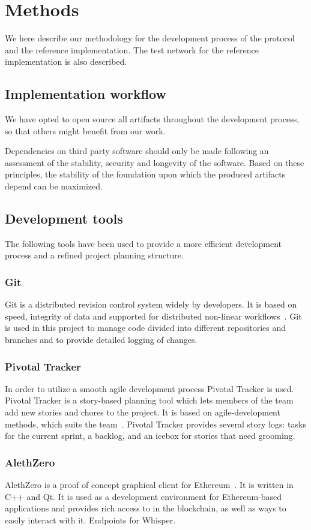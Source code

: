 \chapter{Methods}
We here describe our methodology for the development process of the protocol and the reference implementation. The test network for the reference implementation is also described.

\section{Implementation workflow}
We have opted to open source all artifacts throughout the development process, so that others might benefit from our work.

Dependencies on third party software should only be made following an assessment of the stability, security and longevity of the software. Based on these principles, the stability of the foundation upon which the produced artifacts depend can be maximized.

\section{Development tools}
The following tools have been used to provide a more efficient development process and a refined project planning structure.

\subsection{Git}
Git is a distributed revision control system widely by developers. It is based on speed, integrity of data and supported for distributed non-linear workflows~\cite{git}. Git is used in this project to manage code divided into different repositories and branches and to provide detailed logging of changes. 

\subsection{Pivotal Tracker}
In order to utilize a smooth agile development process Pivotal Tracker is used. Pivotal Tracker is a story-based planning tool which lets members of the team add new stories and chores to the project. It is based on agile-development methods, which suits the team~\cite{pivotaltracker}. Pivotal Tracker provides several story logs: tasks for the current sprint, a backlog, and an icebox for stories that need grooming.

\subsection{AlethZero}
AlethZero is a proof of concept graphical client for Ethereum~\cite{github-alethzero}. It is written in C++ and Qt. It is used as a development environment for Ethereum-based applications and provides rich access to in the blockchain, as well as ways to easily interact with it. Endpoints for Whisper.

